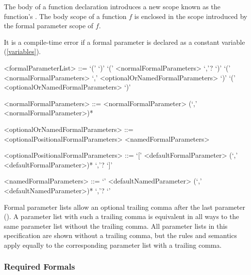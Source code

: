 \documentclass[makeidx]{article}
\begin{document}
\LMHash{}%
The body of a function declaration introduces a new scope known as the function's
.
The body scope of a function $f$ is enclosed in the scope introduced by the formal parameter scope of $f$.



\LMHash{}%
It is a compile-time error if a formal parameter is declared as a constant variable (\ref{variables}).

\begin{grammar}
<formalParameterList> ::= `(' `)'
  \alt `(' <normalFormalParameters> `,'? `)'
  \alt `(' <normalFormalParameters> `,' <optionalOrNamedFormalParameters> `)'
  \alt `(' <optionalOrNamedFormalParameters> `)'

<normalFormalParameters> ::= \gnewline{}
  <normalFormalParameter> (`,' <normalFormalParameter>)*

<optionalOrNamedFormalParameters> ::= <optionalPositionalFormalParameters>
  \alt <namedFormalParameters>

<optionalPositionalFormalParameters> ::= \gnewline{}
  `[' <defaultFormalParameter> (`,' <defaultFormalParameter>)* `,'? `]'

<namedFormalParameters> ::= \gnewline{}
  `{' <defaultNamedParameter> (`,' <defaultNamedParameter>)* `,'? `}'
\end{grammar}

Formal parameter lists allow an optional trailing comma after the last parameter ().
A parameter list with such a trailing comma is equivalent in all ways to the same parameter list without the trailing comma.
All parameter lists in this specification are shown without a trailing comma, but the rules and semantics apply equally to the corresponding parameter list with a trailing comma.


\subsubsection{Required Formals}
\end{document}
